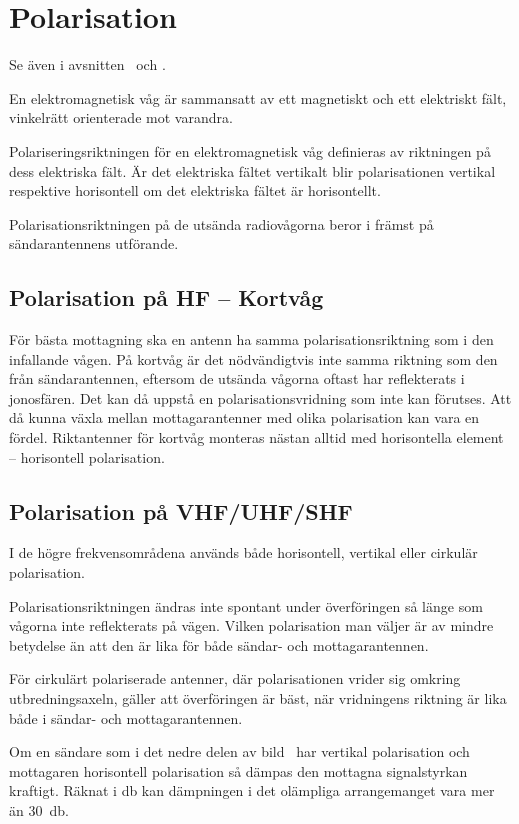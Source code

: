 \section{Polarisation}

Se även i avsnitten~ och
.

En elektromagnetisk våg är sammansatt av ett magnetiskt och ett
elektriskt fält, vinkelrätt orienterade mot varandra.

Polariseringsriktningen för en elektromagnetisk våg definieras av riktningen på
dess elektriska fält.
Är det elektriska fältet vertikalt blir polarisationen vertikal respektive
horisontell om det elektriska fältet är horisontellt.

Polarisationsriktningen på de utsända radiovågorna beror i främst på
sändarantennens utförande.

\subsection{Polarisation på HF -- Kortvåg}
\label{polarisation_hf}

För bästa mottagning ska en antenn ha samma polarisationsriktning som i den
infallande vågen.
På kortvåg är det nödvändigtvis inte samma riktning som den från
sändarantennen, eftersom de utsända vågorna oftast har reflekterats i
jonosfären.
Det kan då uppstå en polarisationsvridning som inte kan förutses.
Att då kunna växla mellan mottagarantenner med olika polarisation kan vara en
fördel.
Riktantenner för kortvåg monteras nästan alltid med horisontella element --
horisontell polarisation.

\subsection{Polarisation på VHF/UHF/SHF}
\label{polarisation_vhf}


I de högre frekvensområdena används både horisontell, vertikal eller
cirkulär polarisation.

Polarisationsriktningen ändras inte spontant under överföringen så
länge som vågorna inte reflekterats på vägen.
Vilken polarisation man väljer är av mindre betydelse än att den är lika
för både sändar- och mottagarantennen.

För cirkulärt polariserade antenner, där polarisationen vrider sig
omkring utbredningsaxeln, gäller att överföringen är bäst, när
vridningens riktning är lika både i sändar- och mottagarantennen.

Om en sändare som i det nedre delen av bild~ har vertikal
polarisation och mottagaren horisontell polarisation så dämpas den mottagna
signalstyrkan kraftigt.
Räknat i \unit{\decibel} kan dämpningen i det olämpliga arrangemanget vara mer
än \qty{30}{\decibel}.
